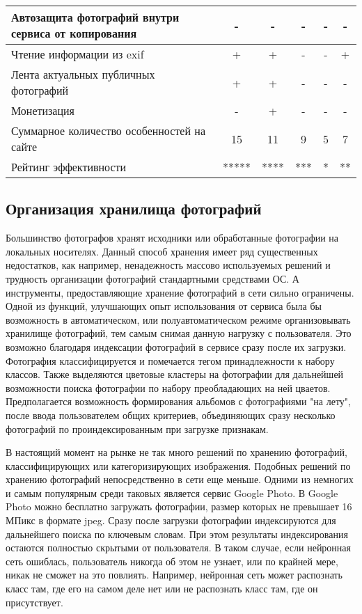 \begin{table}[H]
\begin{tabular}{|l{4cm}|c|c|c|c|c|}
  \hline Автозащита фотографий внутри сервиса от копирования & - & - & - & - & - \\ 
  \hline Чтение информации из exif & + & + & - & - & + \\ 
  \hline Лента актуальных публичных фотографий & + & + & - & - & - \\ 
  \hline Монетизация & - & + & - & - & - \\ 
  \hline Суммарное количество особенностей на сайте & 15 & 11 & 9 & 5 & 7 \\ 
  \hline Рейтинг эффективности & ***** & **** & *** & * & ** \\
  \hline
  \end{tabular}
\end{table}

\subsection{Организация хранилища фотографий}

Большинство фотографов хранят исходники или обработанные фотографии на локальных носителях.
Данный способ хранения имеет ряд существенных недостатков, как например, ненадежность массово используемых решений и трудность организации фотографий стандартными средствами ОС.
А инструменты, предоставляющие хранение фотографий в сети сильно ограничены.
Одной из функций, улучшающих опыт использования от сервиса была бы возможность в автоматическом, или полуавтоматическом режиме организовывать хранилище фотографий, тем самым снимая данную нагрузку с пользователя.
Это возможно благодаря индексации фотографий в сервисе сразу после их загрузки. 
Фотография классифицируется и помечается тегом принадлежности к набору классов.
Также выделяются цветовые кластеры на фотографии для дальнейшей возможности поиска фотографии по набору преобладающих на ней цваетов.
Предполагается возможность формирования альбомов с фотографиями "на лету", после ввода пользователем общих критериев, объединяющих сразу несколько фотографий по проиндексированным при загрузке признакам.


В настоящий момент на рынке не так много решений по хранению фотографий, классифицирующих или категоризирующих изображения.
Подобных решений по хранению фотографий непосредственно в сети еще меньше.
Одними из немногих и самым популярным среди таковых является сервис Google Photo. 
В Google Photo можно бесплатно загружать фотографии, размер которых не превышает 16 МПикс в формате jpeg. 
Сразу после загрузки фотографии индексируются для дальнейшего поиска по ключевым словам.
При этом результаты индексирования остаются полностью скрытыми от пользователя. 
В таком случае, если нейронная сеть ошиблась, пользователь никогда об этом не узнает, или по крайней мере, никак не сможет на это повлиять. 
Например, нейронная сеть может распознать класс там, где его на самом деле нет или не распознать класс там, где он присутствует.

